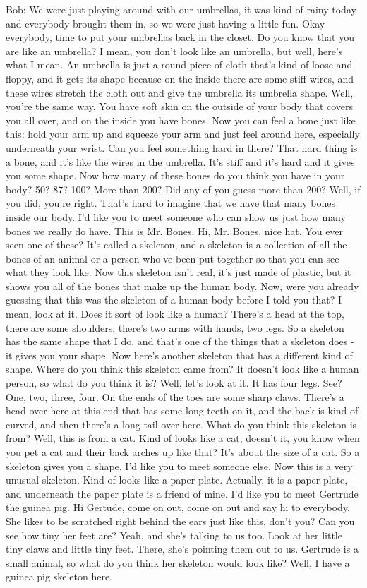 Bob: We were just playing around with our umbrellas, it was kind of rainy today and everybody brought them in, so we were just having a little fun. Okay everybody, time to put your umbrellas back in the closet. Do you know that you are like an umbrella? I mean, you don't look like an umbrella, but well, here's what I mean. An umbrella is just a round piece of cloth that's kind of loose and floppy, and it gets its shape because on the inside there are some stiff wires, and these wires stretch the cloth out and give the umbrella its umbrella shape. Well, you're the same way. You have soft skin on the outside of your body that covers you all over, and on the inside you have bones. Now you can feel a bone just like this: hold your arm up and squeeze your arm and just feel around here, especially underneath your wrist. Can you feel something hard in there? That hard thing is a bone, and it's like the wires in the umbrella. It's stiff and it's hard and it gives you some shape. Now how many of these bones do you think you have in your body? 50? 87? 100? More than 200? Did any of you guess more than 200? Well, if you did, you're right. That's hard to imagine that we have that many bones inside our body. I'd like you to meet someone who can show us just how many bones we really do have. This is Mr. Bones. Hi, Mr. Bones, nice hat. You ever seen one of these? It's called a skeleton, and a skeleton is a collection of all the bones of an animal or a person who've been put together so that you can see what they look like. Now this skeleton isn't real, it's just made of plastic, but it shows you all of the bones that make up the human body. Now, were you already guessing that this was the skeleton of a human body before I told you that? I mean, look at it. Does it sort of look like a human? There's a head at the top, there are some shoulders, there's two arms with hands, two legs. So a skeleton has the same shape that I do, and that's one of the things that a skeleton does - it gives you your shape. Now here's another skeleton that has a different kind of shape. Where do you think this skeleton came from? It doesn't look like a human person, so what do you think it is? Well, let's look at it. It has four legs. See? One, two, three, four. On the ends of the toes are some sharp claws. There's a head over here at this end that has some long teeth on it, and the back is kind of curved, and then there's a long tail over here. What do you think this skeleton is from? Well, this is from a cat. Kind of looks like a cat, doesn't it, you know when you pet a cat and their back arches up like that? It's about the size of a cat. So a skeleton gives you a shape. I'd like you to meet someone else. Now this is a very unusual skeleton. Kind of looks like a paper plate. Actually, it is a paper plate, and underneath the paper plate is a friend of mine. I'd like you to meet Gertrude the guinea pig. Hi Gertude, come on out, come on out and say hi to everybody. She likes to be scratched right behind the ears just like this, don't you? Can you see how tiny her feet are? Yeah, and she's talking to us too. Look at her little tiny claws and little tiny feet. There, she's pointing them out to us. Gertrude is a small animal, so what do you think her skeleton would look like? Well, I have a guinea pig skeleton here. 